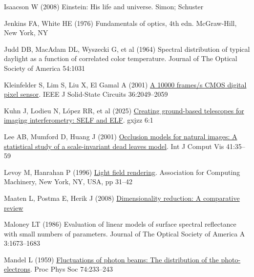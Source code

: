 \documentclass[
  letterpaper,
]{book}
\newlength{\cslhangindent}
\newenvironment{CSLReferences}[2] %
 {\begin{list}{}{%
  \setlength{\itemindent}{0pt}
  \setlength{\leftmargin}{0pt}
  \setlength{\parsep}{0pt}
  \ifodd #1
   \setlength{\leftmargin}{\cslhangindent}
   \setlength{\itemindent}{-1\cslhangindent}
  \fi
  \setlength{\itemsep}{#2\baselineskip}}}
 {\end{list}}
\begin{document}
\begin{CSLReferences}{1}{1}
Isaacson W (2008) Einstein: His life and universe. Simon; Schuster

Jenkins FA, White HE (1976) Fundamentals of optics, 4th edn.
McGraw-Hill, New York, NY

Judd DB, MacAdam DL, Wyszecki G, et al (1964) Spectral distribution of
typical daylight as a function of correlated color temperature. Journal
of The Optical Society of America 54:1031

Kleinfelder S, Lim S, Liu X, El Gamal A (2001)
\href{http://dx.doi.org/10.1109/4.972156}{A 10000 frames/s {CMOS}
digital pixel sensor}. IEEE J Solid-State Circuits 36:2049--2059

Kuhn J, Lodieu N, López RR, et al (2025)
\href{http://dx.doi.org/10.37188/lam.2025.033}{Creating ground-based
telescopes for imaging interferometry: {SELF} and {ELF}}. gxjzz 6:1

Lee AB, Mumford D, Huang J (2001)
\href{http://dx.doi.org/10.1023/a:1011109015675}{Occlusion models for
natural images: A statistical study of a scale-invariant dead leaves
model}. Int J Comput Vis 41:35--59

Levoy M, Hanrahan P (1996)
\href{https://doi.org/10.1145/237170.237199}{Light field rendering}.
Association for Computing Machinery, New York, NY, USA, pp 31--42

Maaten L, Postma E, Herik J (2008)
\href{https://www.researchgate.net/profile/Eric-Postma/publication/228657549_Dimensionality_Reduction_A_Comparative_Review/links/0046353a3047fc2863000000/Dimensionality-Reduction-A-Comparative-Review.pdf}{Dimensionality
reduction: A comparative review}

Maloney LT (1986) Evaluation of linear models of surface spectral
reflectance with small numbers of parameters. Journal of The Optical
Society of America A 3:1673--1683

Mandel L (1959)
\href{http://dx.doi.org/10.1088/0370-1328/74/3/301}{Fluctuations of
photon beams: The distribution of the photo-electrons}. Proc Phys Soc
74:233--243


\end{CSLReferences}
\end{document}
